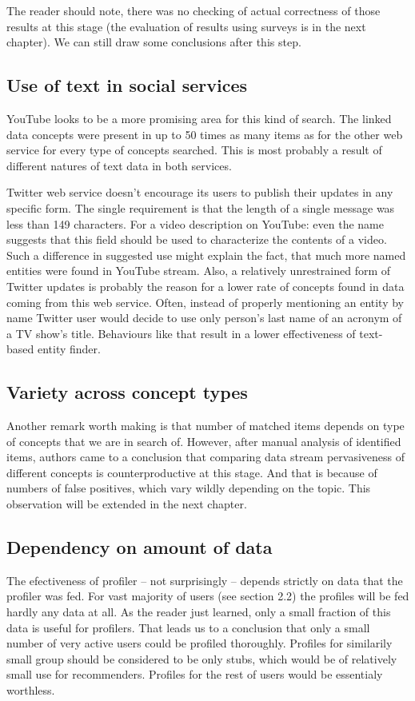 The reader should note, there was no checking of actual correctness of those results at
this stage (the evaluation of results using surveys is in the next chapter). We
can still draw some conclusions after this step.

\subsection{Use of text in social services}
YouTube looks to be a more promising area for this kind of search. The
linked data concepts were present in up to 50 times as many items as for the other
web service for every type of concepts searched. This is most probably a
result of different natures of text data in both services.  

Twitter web service doesn't encourage its users to publish their updates in any
specific form. The single requirement is that the length of a single message
was less than 149 characters. For a video description on YouTube: even the name
suggests that this field should be used to characterize the contents
of a video. Such a difference in suggested use might explain the fact, that
much more named entities were found in YouTube stream. Also, a relatively
unrestrained form of Twitter updates is probably the reason for a lower rate of
concepts found in data coming from this web service. Often, instead of properly
mentioning an entity by name Twitter user would decide to use only person's
last name of an acronym of a TV show's title. Behaviours like that result in a
lower effectiveness of text-based entity finder.

\subsection{Variety across concept types}
Another remark worth making is that number of matched items depends on type of
concepts that we are in search of. However, after manual analysis of identified
items, authors came to a conclusion that comparing data stream pervasiveness of
different concepts is counterproductive at this stage. And that is because of
numbers of false positives, which vary wildly depending on the topic. This
observation will be extended in the next chapter.

\subsection{Dependency on amount of data}
The efectiveness of profiler -- not surprisingly -- depends strictly on data
that the profiler was fed. For vast majority of users (see section 2.2) the
profiles will be fed hardly any data at all. As the reader just learned, only a
small fraction of this data is useful for profilers. That leads us to a
conclusion that only a small number of very active users could be profiled
thoroughly. Profiles for similarily small group should be considered to be only
stubs, which would be of relatively small use for recommenders. Profiles for the
rest of users would be essentialy worthless.
